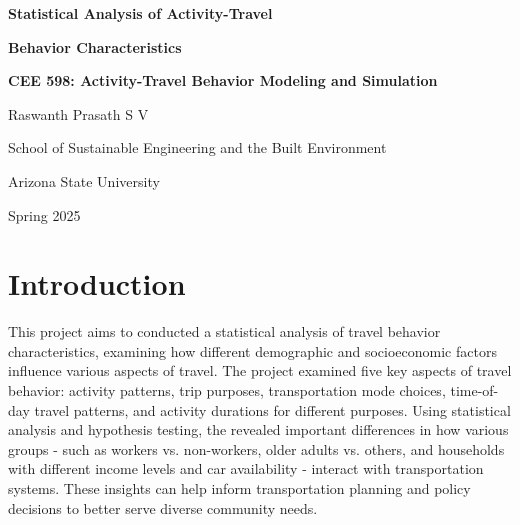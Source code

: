 \documentclass[12pt]{article}
\begin{document}

\thispagestyle{empty}

\begin{center}
    \vspace*{1.5cm}
    
    \textbf{\Large Statistical Analysis of Activity-Travel}
    
    \textbf{\Large Behavior Characteristics}
    
    \vspace{6cm}
    
    \textbf{\Large CEE 598: Activity-Travel Behavior Modeling and Simulation}
    
    \vspace{6cm}
    
    \large{Raswanth Prasath S V}
    
    \vspace{0.5cm}
    
    \large{School of Sustainable Engineering and the Built Environment}
    
    \large{Arizona State University}
    
    \vspace{2cm}
    
    \large{Spring 2025}
    
    \vfill
    
\end{center}

\newpage
{}

\tableofcontents
\newpage

\listoffigures

\listoftables
\newpage


\section{Introduction}

\par{This project aims to conducted a statistical analysis of travel behavior characteristics, examining how different demographic and socioeconomic factors influence various aspects of travel. The project examined five key aspects of travel behavior: activity patterns, trip purposes, transportation mode choices, time-of-day travel patterns, and activity durations for different purposes. Using statistical analysis and hypothesis testing, the revealed important differences in how various groups - such as workers vs. non-workers, older adults vs. others, and households with different income levels and car availability - interact with transportation systems. These insights can help inform transportation planning and policy decisions to better serve diverse community needs.}
\end{document}
